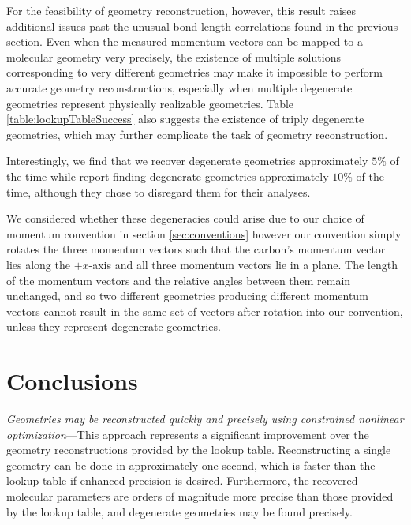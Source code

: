 For the feasibility of geometry reconstruction, however, this result raises additional issues past the unusual bond length correlations found in the previous section. Even when the measured momentum vectors can be mapped to a molecular geometry very precisely, the existence of multiple solutions corresponding to very different geometries may make it impossible to perform accurate geometry reconstructions, especially when multiple degenerate geometries represent physically realizable geometries. Table \ref{table:lookupTableSuccess} also suggests the existence of triply degenerate geometries, which may further complicate the task of geometry reconstruction.

Interestingly, we find that we recover degenerate geometries approximately $5\%$ of the time while \citet[supplementary information]{Kunitski15} report finding degenerate geometries approximately $10\%$ of the time, although they chose to disregard them for their analyses.

We considered whether these degeneracies could arise due to our choice of momentum convention in section \ref{sec:conventions} however our convention simply rotates the three momentum vectors such that the carbon's momentum vector lies along the $+x$-axis and all three momentum vectors lie in a plane. The length of the momentum vectors and the relative angles between them remain unchanged, and so two different geometries producing different momentum vectors cannot result in the same set of vectors after rotation into our convention, unless they represent degenerate geometries.

\section{Conclusions}
\emph{Geometries may be reconstructed quickly and precisely using constrained nonlinear optimization}---This approach represents a significant improvement over the geometry reconstructions provided by the lookup table. Reconstructing a single geometry can be done in approximately one second, which is faster than the lookup table if enhanced precision is desired. Furthermore, the recovered molecular parameters are orders of magnitude more precise than those provided by the lookup table, and degenerate geometries may be found precisely.

%
%
%
